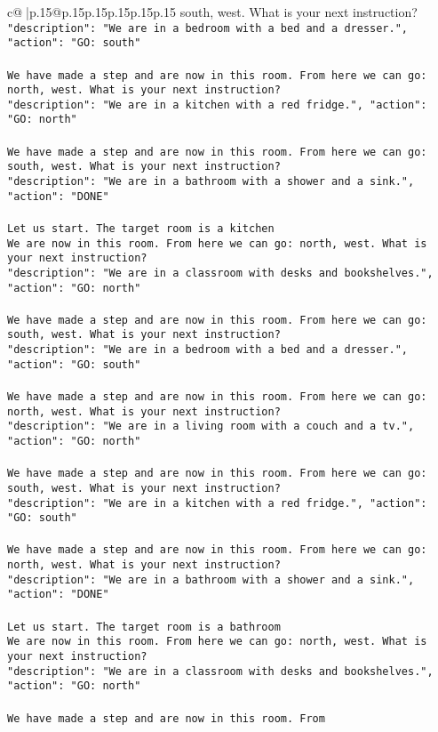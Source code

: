 \documentclass{article}
\begin{document}
{\begin{supertabular}{c@{$\;$}|p{.15\linewidth}@{}p{.15\linewidth}p{.15\linewidth}p{.15\linewidth}p{.15\linewidth}p{.15\linewidth}}
{{{south, west. What is your next instruction?\\ \tt {"description": "We are in a bedroom with a bed and a dresser.", "action": "GO: south"}\\ \tt \\ \tt We have made a step and are now in this room. From here we can go: north, west. What is your next instruction?\\ \tt {"description": "We are in a kitchen with a red fridge.", "action": "GO: north"}\\ \tt \\ \tt We have made a step and are now in this room. From here we can go: south, west. What is your next instruction?\\ \tt {"description": "We are in a bathroom with a shower and a sink.", "action": "DONE"}\\ \tt \\ \tt Let us start. The target room is a kitchen\\ \tt We are now in this room. From here we can go: north, west. What is your next instruction?\\ \tt {"description": "We are in a classroom with desks and bookshelves.", "action": "GO: north"}\\ \tt \\ \tt We have made a step and are now in this room. From here we can go: south, west. What is your next instruction?\\ \tt {"description": "We are in a bedroom with a bed and a dresser.", "action": "GO: south"}\\ \tt \\ \tt We have made a step and are now in this room. From here we can go: north, west. What is your next instruction?\\ \tt {"description": "We are in a living room with a couch and a tv.", "action": "GO: north"}\\ \tt \\ \tt We have made a step and are now in this room. From here we can go: south, west. What is your next instruction?\\ \tt {"description": "We are in a kitchen with a red fridge.", "action": "GO: south"}\\ \tt \\ \tt We have made a step and are now in this room. From here we can go: north, west. What is your next instruction?\\ \tt {"description": "We are in a bathroom with a shower and a sink.", "action": "DONE"}\\ \tt \\ \tt Let us start. The target room is a bathroom\\ \tt We are now in this room. From here we can go: north, west. What is your next instruction?\\ \tt {"description": "We are in a classroom with desks and bookshelves.", "action": "GO: north"}\\ \tt \\ \tt We have made a step and are now in this room. From }}}
\end{supertabular}}
\end{document}
